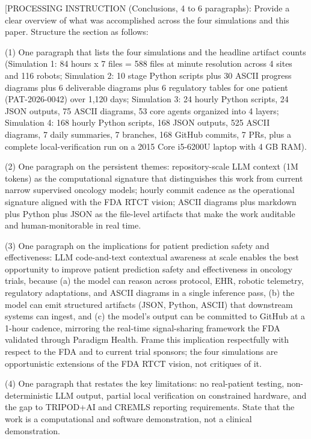 
[PROCESSING INSTRUCTION (Conclusions, 4 to 6 paragraphs): Provide a clear
overview of what was accomplished across the four simulations and this
paper. Structure the section as follows:

(1) One paragraph that lists the four simulations and the headline
artifact counts (Simulation 1: 84 hours x 7 files = 588 files at minute
resolution across 4 sites and 116 robots; Simulation 2: 10 stage Python
scripts plus 30 ASCII progress diagrams plus 6 deliverable diagrams plus
6 regulatory tables for one patient (PAT-2026-0042) over 1,120 days;
Simulation 3: 24 hourly Python scripts, 24 JSON outputs, 75 ASCII
diagrams, 53 core agents organized into 4 layers; Simulation 4: 168
hourly Python scripts, 168 JSON outputs, 525 ASCII diagrams, 7 daily
summaries, 7 branches, 168 GitHub commits, 7 PRs, plus a complete
local-verification run on a 2015 Core i5-6200U laptop with 4 GB RAM).

(2) One paragraph on the persistent themes: repository-scale LLM context
(1M tokens) as the computational signature that distinguishes this work
from current narrow supervised oncology models; hourly commit cadence as
the operational signature aligned with the FDA RTCT vision; ASCII
diagrams plus markdown plus Python plus JSON as the file-level artifacts
that make the work auditable and human-monitorable in real time.

(3) One paragraph on the implications for patient prediction safety and
effectiveness: LLM code-and-text contextual awareness at scale enables
the best opportunity to improve patient prediction safety and effectiveness
in oncology trials, because (a) the model can reason across protocol,
EHR, robotic telemetry, regulatory adaptations, and ASCII diagrams in a
single inference pass, (b) the model can emit structured artifacts (JSON,
Python, ASCII) that downstream systems can ingest, and (c) the model's
output can be committed to GitHub at a 1-hour cadence, mirroring the
real-time signal-sharing framework the FDA validated through Paradigm
Health. Frame this implication respectfully with respect to the FDA and
to current trial sponsors; the four simulations are opportunistic
extensions of the FDA RTCT vision, not critiques of it.

(4) One paragraph that restates the key limitations: no real-patient
testing, non-deterministic LLM output, partial local verification on
constrained hardware, and the gap to TRIPOD+AI and CREMLS reporting
requirements. State that the work is a computational and software
demonstration, not a clinical demonstration.

